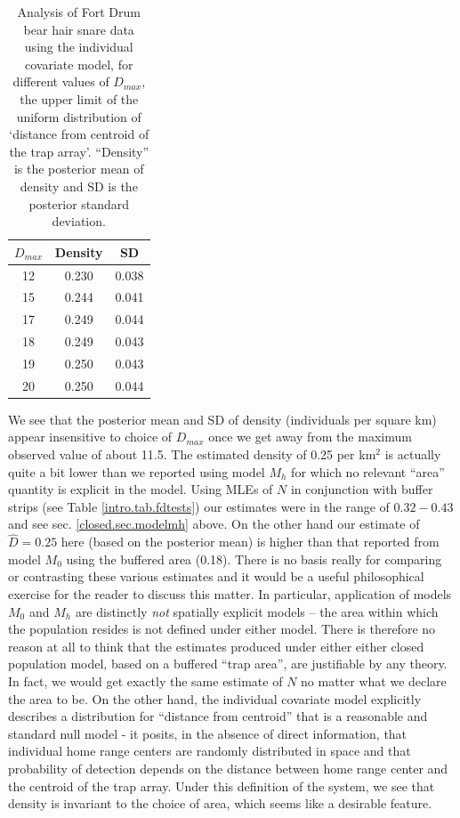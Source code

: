 \begin{table}[htp]
\centering
\caption{Analysis of Fort Drum bear hair snare data using the
  individual covariate model, for different values of $D_{max}$, the upper
  limit of the uniform distribution of `distance from centroid of the
  trap array'. ``Density'' is the posterior mean of density and SD is
  the posterior standard deviation.}
\begin{tabular}{ccc}
\hline %
 $D_{max}$ & Density & SD \\ \hline
  12& 0.230 & 0.038 \\
  15& 0.244 &0.041 \\
  17& 0.249 &0.044 \\
  18& 0.249 &0.043\\
  19& 0.250 &0.043\\
  20& 0.250 &0.044 \\
\hline
\end{tabular}
\label{closed.tab.Dmax}
\end{table}


We see that the posterior mean and SD of density (individuals per
square km) appear insensitive to choice of $D_{max}$ once we get away from the maximum observed value of about 11.5. The estimated
density of 0.25 per km$^2$ is actually quite a bit lower than we
reported using model $M_h$ for which no relevant ``area'' quantity is
explicit in the model.  Using MLEs of $N$ in conjunction with buffer
strips (see Table \ref{intro.tab.fdtests}) our estimates were in the
range of $0.32-0.43$ and see sec.  \ref{closed.sec.modelmh} above.  On
the other hand our estimate of $\hat{D} = 0.25$ here (based on the
posterior mean) is higher than that reported from model $M_0$ using
the buffered area (0.18). There is no basis really for comparing or
contrasting these various estimates and it would be a useful
philosophical exercise for the reader to discuss this matter. In
particular, application of models $M_0$ and $M_h$ are distinctly {\it
  not} spatially explicit models -- the area within which the
population resides is not defined under either model. There is
therefore no reason at all to think that the estimates produced under
either either closed population model, based on a buffered ``trap
area'', are justifiable by any theory. In fact, we would get exactly
the same estimate of $N$ no matter what we declare the area to be. On
the other hand, the individual covariate model explicitly describes a
distribution for ``distance from centroid'' that is a reasonable and
standard null model - it posits, in the absence of direct information,
that individual home range centers are randomly distributed in space
and that probability of detection depends on the distance between home
range center and the centroid of the trap array. Under this definition
of the system, we see that density is invariant to the choice of area,
which seems like a desirable feature.


